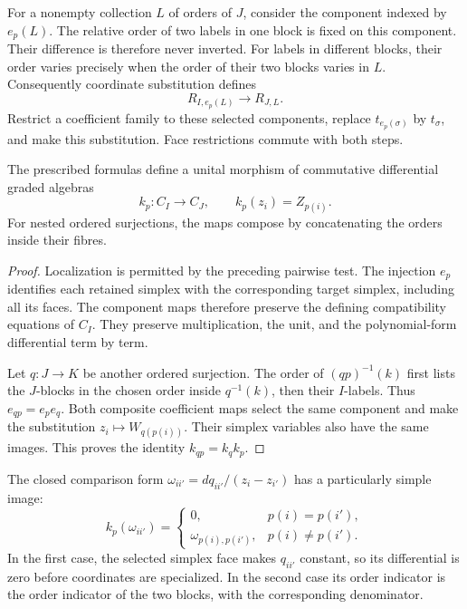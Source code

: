 For a nonempty collection $L$ of orders of $J$, consider the
component indexed by $e_p(L)$.
The relative order of two labels in one block is fixed on this
component. Their difference is therefore never inverted.
For labels in different blocks, their order varies precisely when
the order of their two blocks varies in $L$.
Consequently coordinate substitution defines
\[
 R_{I,e_p(L)}\longrightarrow R_{J,L}.
\]
Restrict a coefficient family to these selected components,
replace $t_{e_p(\sigma)}$ by $t_\sigma$, and make this substitution.
Face restrictions commute with both steps.

\begin{proposition}\label{prop:moi-coefficient-map}
The prescribed formulas define a unital morphism of commutative
differential graded algebras
\[
 k_p:C_I\longrightarrow C_J,
 \qquad k_p(z_i)=Z_{p(i)}.
\]
For nested ordered surjections, the maps compose by concatenating
the orders inside their fibres.
\end{proposition}
\begin{proof}
Localization is permitted by the preceding pairwise test.
The injection $e_p$ identifies each retained simplex with the
corresponding target simplex, including all its faces.
The component maps therefore preserve the defining compatibility
equations of $C_I$.
They preserve multiplication, the unit, and the polynomial-form
differential term by term.

Let $q:J\to K$ be another ordered surjection.
The order of $(qp)^{-1}(k)$ first lists the $J$-blocks in the
chosen order inside $q^{-1}(k)$, then their $I$-labels.
Thus $e_{qp}=e_p e_q$.
Both composite coefficient maps select the same component and
make the substitution $z_i\mapsto W_{q(p(i))}$.
Their simplex variables also have the same images.
This proves the identity $k_{qp}=k_qk_p$.
\end{proof}

The closed comparison form
$\omega_{ii'}=dq_{ii'}/(z_i-z_{i'})$ has a particularly simple image:
\begin{equation}\label{eq:moi-omega-image}
 k_p(\omega_{ii'})=
 \begin{cases}
 0,&p(i)=p(i'),\\
 \omega_{p(i),p(i')},&p(i)\ne p(i').
 \end{cases}
\end{equation}
In the first case, the selected simplex face makes $q_{ii'}$
constant, so its differential is zero before coordinates are
specialized.
In the second case its order indicator is the order indicator
of the two blocks, with the corresponding denominator.


